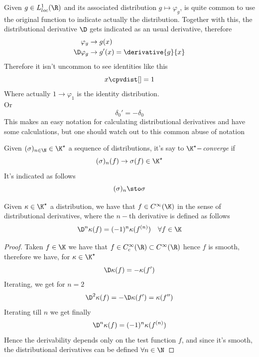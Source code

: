 \documentclass[../mmf.tex]{subfiles}
\begin{document}
\begin{ntn}
	Given $g\in L^1_{loc}(\R)$ and its associated distribution $g\mapsto\varphi_g$, is quite common to use the original function to indicate actually the distribution. Together with this, the distributional derivative $\D$ gets indicated as an usual derivative, therefore
	\begin{equation*}
		\begin{aligned}
			\varphi_g&\to g(x)\\
			\D\varphi_g&\to g'(x)=\derivative{g}{x}
		\end{aligned}
	\end{equation*}
	Therefore it isn't uncommon to see identities like this
	\begin{equation*}
		x\cpvdist[]=1
	\end{equation*}
	Where actually $1\to\varphi_1$ is the identity distribution.\\
	Or
	\begin{equation*}
		\delta_0'=-\delta_0
	\end{equation*}
	This makes an easy notation for calculating distributional derivatives and have some calculations, but one should watch out to this common abuse of notation
\end{ntn}
\begin{dfn}
	Given $(\sigma)_{n\in\N}\in\K^\star$ a sequence of distributions, it's say to $\K^\star-$\textit{converge} if
	\begin{equation*}
		(\sigma)_n(f)\to\sigma(f)\in\K^\star
	\end{equation*}
	It's indicated as follows
	\begin{equation*}
		(\sigma)_n\sto\sigma
	\end{equation*}
\end{dfn}
\begin{thm}
	Given $\kappa\in\K^\star$ a distribution, we have that $f\in C^{\infty}(\K)$ in the sense of distributional derivatives, where the $n-$th derivative is defined as follows
	\begin{equation*}
		\D^n\kappa(f)=(-1)^n\kappa(f^{(n)})\quad\forall f\in\K
	\end{equation*}
\end{thm}
\begin{proof}
	Taken $f\in\K$ we have that $f\in C_c^\infty(\R)\subset C^\infty(\R)$ hence $f$ is smooth, therefore we have, for $\kappa\in\K^\star$
	\begin{equation*}
		\D\kappa(f)=-\kappa(f')
	\end{equation*}
	Iterating, we get for $n=2$
	\begin{equation*}
		\D^2\kappa(f)=-\D\kappa(f')=\kappa(f'')
	\end{equation*}
	Iterating till $n$ we get finally
	\begin{equation*}
		\D^n\kappa(f)=(-1)^n\kappa(f^{(n)})
	\end{equation*}
	Hence the derivability depends only on the test function $f$, and since it's smooth, the distributional derivatives can be defined $\forall n\in\N$
\end{proof}
\end{document}
